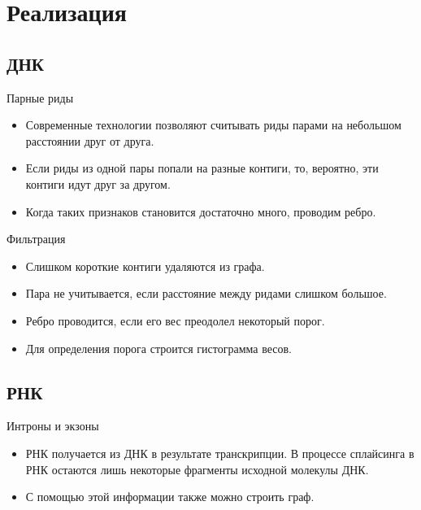 \documentclass{beamer}
\newcommand{\cimg}[2]{%
	\begin{center}%
		\ifthenelse{\equal{#2}{}}{%
			\texttt{[image: \#1]}
		}{%
			\texttt{[image: \#1]}
		}%
	\end{center}%
}
\begin{document}
\section{Реализация}
\subsection{ДНК}

\begin{frame}[t]{Парные риды}
    \begin{itemize}
    \item
        Современные технологии позволяют считывать риды парами на небольшом
        расстоянии друг от друга.
    \item
        Если риды из одной пары попали на разные контиги, то, вероятно, эти 
        контиги идут друг за другом.
    \item
        Когда таких признаков становится достаточно много, проводим ребро.
    \end{itemize}
    \cimg{2.jpg}{0.75}
\end{frame}

\begin{frame}[t]{Фильтрация}
    \begin{itemize}
    \item
        Слишком короткие контиги удаляются из графа.
    \item
        Пара не учитывается, если расстояние между ридами слишком большое.
    \item
        Ребро проводится, если его вес преодолел некоторый порог.
    \item
        Для определения порога строится гистограмма весов.
    \end{itemize}
\end{frame}

\subsection{РНК}

\begin{frame}[t]{Интроны и экзоны}
    \begin{itemize}
    \item
        РНК получается из ДНК в результате транскрипции. В процессе сплайсинга
        в РНК остаются лишь некоторые фрагменты исходной молекулы ДНК.
    \item
        С помощью этой информации также можно строить граф.
    \end{itemize}
    \cimg{3.jpg}{0.75}
\end{frame}
\end{document}
